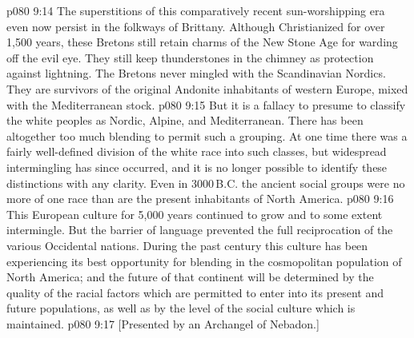 \vs p080 9:14 The superstitions of this comparatively recent sun\hyp{}worshipping era even now persist in the folkways of Brittany. Although Christianized for over 1,500 years, these Bretons still retain charms of the New Stone Age for warding off the evil eye. They still keep thunderstones in the chimney as protection against lightning. The Bretons never mingled with the Scandinavian Nordics. They are survivors of the original Andonite inhabitants of western Europe, mixed with the Mediterranean stock.
\vs p080 9:15 \pc But it is a fallacy to presume to classify the white peoples as Nordic, Alpine, and Mediterranean. There has been altogether too much blending to permit such a grouping. At one time there was a fairly well\hyp{}defined division of the white race into such classes, but widespread intermingling has since occurred, and it is no longer possible to identify these distinctions with any clarity. Even in 3000\,B.C. the ancient social groups were no more of one race than are the present inhabitants of North America.
\vs p080 9:16 This European culture for 5,000 years continued to grow and to some extent intermingle. But the barrier of language prevented the full reciprocation of the various Occidental nations. During the past century this culture has been experiencing its best opportunity for blending in the cosmopolitan population of North America; and the future of that continent will be determined by the quality of the racial factors which are permitted to enter into its present and future populations, as well as by the level of the social culture which is maintained.
\vsetoff
\vs p080 9:17 [Presented by an Archangel of Nebadon.]
\quizlink
